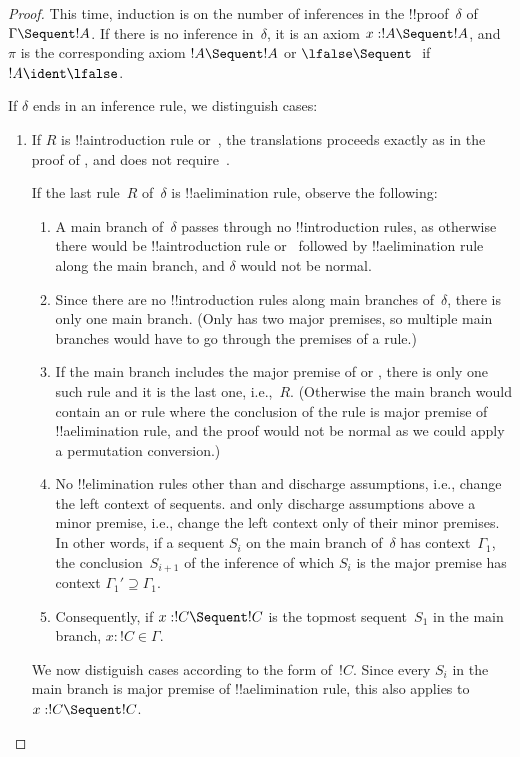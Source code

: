 \documentclass[../../../include/open-logic-section]{subfiles}
\begin{document}
\begin{proof}
This time, induction is on the number of inferences in the
!!{proof}~$\delta$ of $\Gamma \Sequent !A$. If there is no inference in~$\delta$, it is an axiom $x:!A \Sequent !A$, and $\pi$ is the
corresponding axiom $!A \Sequent !A$ or $\lfalse \Sequent \ $ if $!A
\ident \lfalse$.

If $\delta$ ends in an inference rule, we distinguish cases:
\begin{enumerate}
  \item If $R$ is !!a{introduction} rule or~\FalseInt, the
  translations proceeds exactly as in the proof of
  , and does not require~\Cut.

  If the last rule~$R$ of~$\delta$ is !!a{elimination} rule, observe
  the following:
  \begin{enumerate}
    \item A main branch of~$\delta$ passes through no
    !!{introduction} rules, as otherwise there would be
    !!a{introduction} rule or~\FalseInt{} followed by !!a{elimination}
    rule along the main branch, and $\delta$ would not be normal.
    \item Since there are no !!{introduction} rules along main
    branches of~$\delta$, there is only one main branch. (Only
    \Intro{\land} has two major premises, so multiple main branches
    would have to go through the premises of a \Intro{\land} rule.)
    \item If the main branch includes the major premise of \Elim{\lor}
    or \Elim{\lexists}, there is only one such rule and it is the last
    one, i.e.,~$R$. (Otherwise the main branch would contain an
    \Elim{\lor} or \Elim{\lexists} rule where the conclusion of the
    rule is major premise of !!a{elimination} rule, and the proof
    would not be normal as we could apply a permutation conversion.)
  \item No !!{elimination} rules other than \Elim{\lor} and
  \Elim{\lexists} discharge assumptions, i.e., change the left context
  of sequents. \Elim{\lor} and \Elim{\lexists} only discharge
  assumptions above a minor premise, i.e., change the left context
  only of their minor premises. In other words, if a sequent $S_i$ on
  the main branch of~$\delta$ has context~$\Gamma_1$, the
  conclusion~$S_{i+1}$ of the inference of which $S_i$ is the major
  premise has context $\Gamma_1' \supseteq \Gamma_1$.
  \item Consequently, if $x: !C \Sequent !C$ is the topmost
  sequent~$S_1$ in the main branch, $x:!C \in \Gamma$. 
  \end{enumerate}
  We now distiguish cases according to the form of~$!C$. Since every
  $S_i$ in the main branch is major premise of !!a{elimination} rule,
  this also applies to $x:!C \Sequent !C$.


\end{enumerate}
\end{proof}
\end{document}
